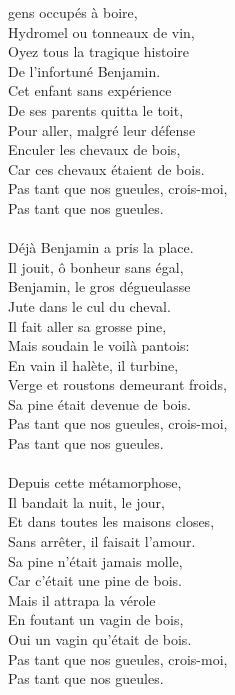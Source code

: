 
 gens occupés à boire,
\\Hydromel ou tonneaux de vin,
\\Oyez tous la tragique histoire
\\De l'infortuné Benjamin.
\\Cet enfant sans expérience
\\De ses parents quitta le toit,
\\Pour aller, malgré leur défense
\\Enculer les chevaux de bois,
\\Car ces chevaux étaient de bois. \bissimple
\\Pas tant que nos gueules, crois-moi,
\\Pas tant que nos gueules.
\\\\Déjà Benjamin a pris la place.
\\Il jouit, ô bonheur sans égal,
\\Benjamin, le gros dégueulasse
\\Jute dans le cul du cheval.
\\Il fait aller sa grosse pine,
\\Mais soudain le voilà pantois:
\\En vain il halète, il turbine,
\\Verge et roustons demeurant froids,
\\Sa pine était devenue de bois. \bissimple
\\Pas tant que nos gueules, crois-moi,
\\Pas tant que nos gueules.
\\\\Depuis cette métamorphose,
\\Il bandait la nuit, le jour,
\\Et dans toutes les maisons closes,
\\Sans arrêter, il faisait l'amour.
\\Sa pine n'était jamais molle,
\\Car c'était une pine de bois.
\\Mais il attrapa la vérole
\\En foutant un vagin de bois,
\\Oui un vagin qu'était de bois. \bissimple
\\Pas tant que nos gueules, crois-moi,
\\Pas tant que nos gueules.

\breakpage